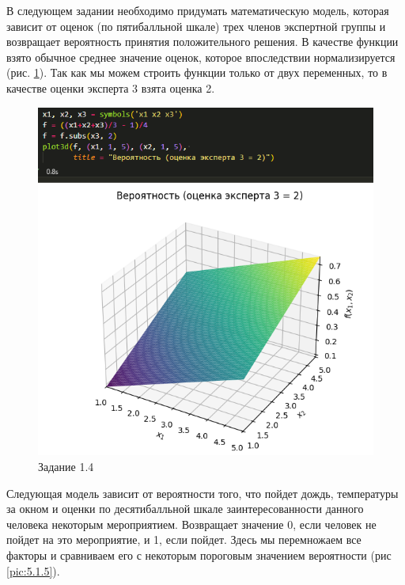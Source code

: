 \documentclass[14pt,a4paper]{extarticle}
\begin{document}
В следующем задании необходимо придумать математическую модель,
которая зависит от оценок (по пятибалльной шкале) трех членов
экспертной группы и возвращает вероятность принятия
положительного решения. В качестве функции взято обычное среднее
значение оценок, которое впоследствии нормализируется (рис. \ref{pic:5.1.4}).
Так как мы можем строить функции только от двух переменных,
то в качестве оценки эксперта 3 взята оценка 2.

\begin{figure}
    [ht!]\centering
    \includegraphics[width=\linewidth]{figures/5.1/4.png}
    \caption{Задание 1.4}
    \label{pic:5.1.4}
\end{figure}
\newpage

Следующая модель зависит от вероятности того, что пойдет дождь,
температуры за окном и оценки по десятибалльной шкале
заинтересованности данного человека некоторым мероприятием.
Возвращает значение 0, если человек не пойдет на это мероприятие,
и 1, если пойдет. Здесь мы перемножаем все факторы и сравниваем
его с некоторым пороговым значением вероятности (рис \ref{pic:5.1.5}).
\end{document}

